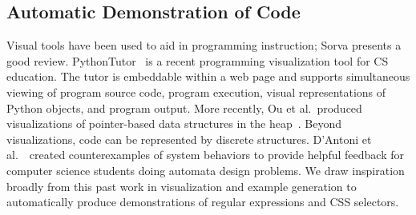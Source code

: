 \subsection{Automatic Demonstration of Code}

Visual tools have been used to aid in programming instruction; Sorva \cite{sorva_visual_2012} presents a good review.
PythonTutor~\cite{guo_online_2013} is a recent programming visualization tool for CS education.
The tutor is embeddable within a web page and supports simultaneous viewing of program source code, program execution, visual representations of Python objects, and program output.
More recently, Ou et al.\ produced visualizations of pointer-based data structures in the heap~\cite{ou_interactive_2015}.
Beyond visualizations, code can be represented by discrete structures.
D'Antoni et al.~\cite{dantoni_how_2015}\ created counterexamples of system behaviors to provide helpful feedback for computer science students doing automata design problems.
We draw inspiration broadly from this past work in visualization and example generation to automatically produce demonstrations of regular expressions and CSS selectors.
